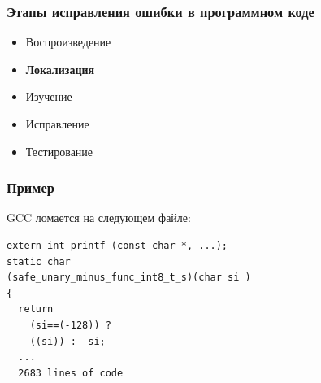


\begin{frame}
	\frametitle{Этапы исправления ошибки в программном коде}
	\begin{itemize}
		\item Воспроизведение
		\item \textbf{Локализация}
		\item Изучение
		\item Исправление
		\item Тестирование
	\end{itemize}
\end{frame}



\begin{frame}[fragile]
	\frametitle{Пример}
	GCC ломается на следующем файле:
	\begin{lstlisting}[style =crs_cpp]
extern int printf (const char *, ...);
static char
(safe_unary_minus_func_int8_t_s)(char si )
{
  return
    (si==(-128)) ?
    ((si)) : -si;
  ...
  2683 lines of code
\end{lstlisting}
\end{frame}



